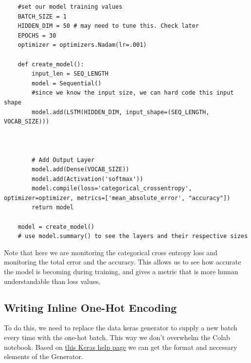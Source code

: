 \documentclass{article}
\begin{document}
\begin{verbatim}
    #set our model training values
    BATCH_SIZE = 1
    HIDDEN_DIM = 50 # may need to tune this. Check later
    EPOCHS = 30
    optimizer = optimizers.Nadam(lr=.001)
    
    def create_model():
        input_len = SEQ_LENGTH
        model = Sequential()
        #since we know the input size, we can hard code this input shape
        model.add(LSTM(HIDDEN_DIM, input_shape=(SEQ_LENGTH, VOCAB_SIZE)))


    
        # Add Output Layer
        model.add(Dense(VOCAB_SIZE))
        model.add(Activation('softmax'))
        model.compile(loss='categorical_crossentropy', optimizer=optimizer, metrics=['mean_absolute_error', "accuracy"])
        return model

    model = create_model()
    # use model.summary() to see the layers and their respective sizes
\end{verbatim}

Note that here we are monitoring the categorical cross entropy loss and monitoring the total error and the accuracy. This allows us to see how accurate the model is becoming during training, and gives a metric that is more human understandable than loss values.


\subsection{Writing Inline One-Hot Encoding}

To do this, we need to replace the data keras generator to supply a new batch every time with the one-hot batch. This way we don't overwhelm the Colab notebook. Based on \href{https://github.com/keras-team/keras/issues/9707}{this Keras help page} we can get the format and necessary elements of the Generator.
\end{document}
